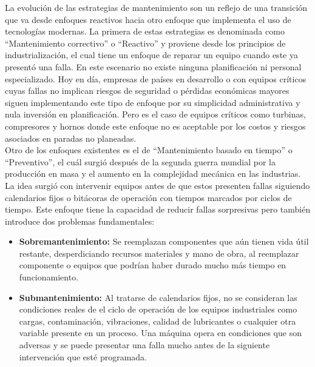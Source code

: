 La evolución de las estrategias de mantenimiento son un reflejo de una transición que va desde enfoques reactivos hacia otro enfoque que implementa el uso de tecnologías modernas. 
La primera de estas estrategias es denominada como ``Mantenimiento correctivo'' o ``Reactivo'' y proviene desde los principios de industrialización, 
el cual tiene un enfoque de reparar un equipo cuando este ya presentó una falla. En este escenario no existe ninguna planificación ni personal especializado. 
Hoy en día, empresas de países en desarrollo o con equipos críticos cuyas fallas no implican riesgos de seguridad o pérdidas económicas mayores siguen implementando este tipo de 
enfoque por su simplicidad administrativa y nula inversión en planificación. Pero es el caso de equipos críticos como turbinas, compresores y hornos donde este enfoque no es 
aceptable por los costos y riesgos asociados en paradas no planeadas.\\[.15cm]


Otro de los enfoques existentes es el de ``Mantenimiento basado en tiempo'' o ``Preventivo'', el cuál surgió después de la segunda guerra mundial por la producción 
en masa y el aumento en la complejidad mecánica en las industrias. La idea surgió con intervenir equipos antes de que estos presenten fallas siguiendo calendarios 
fijos o bitácoras de operación con tiempos marcados por ciclos de tiempo. Este enfoque tiene la capacidad de reducir fallas sorpresivas pero también introduce dos 
problemas fundamentales:

\begin{itemize}
    \item \textbf{Sobremantenimiento:} Se reemplazan componentes que aún tienen vida útil restante, desperdiciando recursos materiales y mano de obra, 
    al reemplazar componente o equipos que podrían haber durado mucho más tiempo en funcionamiento.
    \item \textbf{Submantenimiento:} Al tratarse de calendarios fijos, no se consideran las condiciones reales de el ciclo de operación de los equipos 
    industriales como cargas, contaminación, vibraciones, calidad de lubricantes o cualquier otra variable presente en un proceso. Una máquina opera en 
    condiciones que son adversas y se puede presentar una falla mucho antes de la siguiente intervención que esté programada.
\end{itemize}

